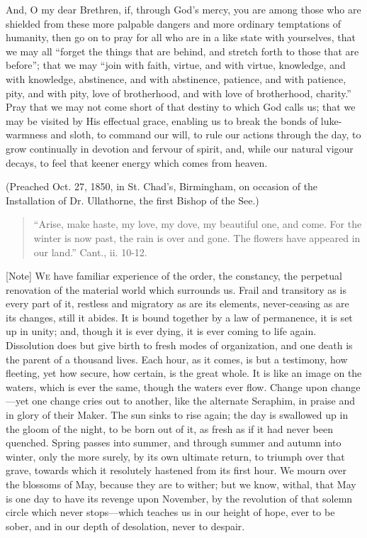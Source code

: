 And, O my dear Brethren, if, through God's mercy, you
are among those who are shielded from these more palpable
dangers and more ordinary temptations of humanity, then
go on to pray for all who are in a like state with
yourselves, that we may all ``forget the things that
are behind, and stretch forth to those that are
before''; that we may ``join with faith, virtue,
and with virtue, knowledge, and with knowledge,
abstinence, and with abstinence, patience, and with
patience, pity, and with pity, love of brotherhood, and
with love of brotherhood, charity.'' Pray that we may
not come short of that destiny to which God calls us;
that we may be visited by His effectual grace, enabling
us to break the bonds of luke-warmness and sloth, to
command our will, to rule our actions through the day, to
grow continually in devotion and fervour of spirit, and,
while our natural vigour decays, to feel that keener
energy which comes from heaven.

(Preached Oct. 27, 1850, in St. Chad's, Birmingham, on
occasion of the Installation of Dr. Ullathorne, the first
Bishop of the See.)


\begin{quote}

``Arise, make haste, my love, my dove, my
beautiful one, and come. For the winter is now past,
the rain is over and gone. The flowers have appeared
in our land.'' Cant., ii. 10-12.

\end{quote}

[Note] W\textsc{e} have familiar experience of the order, the
constancy, the perpetual renovation of the material world
which surrounds us. Frail and transitory as is every part
of it, restless and migratory as are its elements,
never-ceasing as are its changes, still it abides. It is
bound together by a law of permanence, it is set up in
unity; and, though it is ever dying, it is ever coming to
life again. Dissolution does but give birth to fresh
modes of organization, and one death is the parent of a thousand lives. Each hour, as it comes, is but a
testimony, how fleeting, yet how secure, how certain, is
the great whole. It is like an image on the waters, which
is ever the same, though the waters ever flow. Change
upon change—yet one change cries out to another,
like the alternate Seraphim, in praise and in glory of
their Maker. The sun sinks to rise again; the day is
swallowed up in the gloom of the night, to be born out of
it, as fresh as if it had never been quenched. Spring
passes into summer, and through summer and autumn into
winter, only the more surely, by its own ultimate return,
to triumph over that grave, towards which it resolutely
hastened from its first hour. We mourn over the blossoms
of May, because they are to wither; but we know, withal,
that May is one day to have its revenge upon November, by
the revolution of that solemn circle which never
stops—which teaches us in our height of hope, ever
to be sober, and in our depth of desolation, never to
despair.

